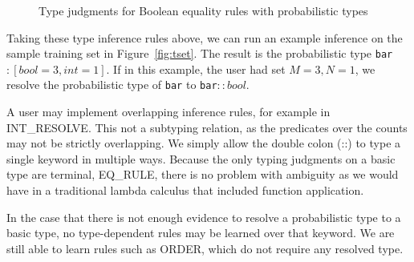 {
\setlength{\abovecaptionskip}{-.05pt}
\setlength{\belowcaptionskip}{-15pt}
\begin{figure}
\caption{Type judgments for Boolean equality rules with probabilistic types}
\label{fig:ptypes}
\end{figure}
}

Taking these type inference rules above, we can run an example inference on the sample training set in Figure~\ref{fig:tset}.
The result is the probabilistic type \texttt{bar}$:[bool=3,int=1]$.
If in this example, the user had set $M=3, N=1$, we resolve the probabilistic type of \texttt{bar} to \texttt{bar}$::bool$.

 
A user may implement overlapping inference rules, for example in {\scriptsize INT\_RESOLVE}.
This not a subtyping relation, as the predicates over the counts may not be strictly overlapping.
We simply allow the double colon (::) to type a single keyword in multiple ways.
Because the only typing judgments on a basic type are terminal, {\scriptsize EQ\_RULE}, there is no problem with ambiguity as we would have in a traditional lambda calculus that included function application.


In the case that there is not enough evidence to resolve a probabilistic type to a basic type, no type-dependent rules may be learned over that keyword.
We are still able to learn rules such as {\scriptsize ORDER}, which do not require any resolved type. 


